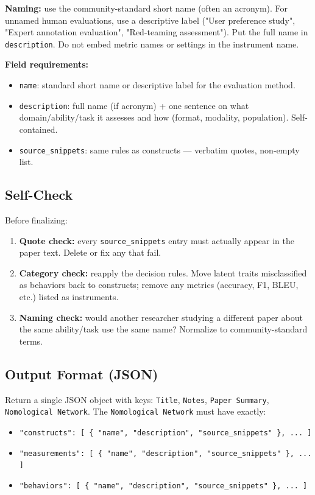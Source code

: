 \begin{tcolorbox}[breakable,enhanced,colback=blue!3,colframe=blue!40!black,title={Prompt},fonttitle=\bfseries,left=8pt,right=8pt,top=6pt,bottom=6pt]
\textbf{Naming:} use the community-standard short name (often an acronym). For unnamed human evaluations, use a descriptive label ("User preference study", "Expert annotation evaluation", "Red-teaming assessment"). Put the full name in \texttt{description}. Do not embed metric names or settings in the instrument name.

\textbf{Field requirements:}
\begin{itemize}
\item \texttt{name}: standard short name or descriptive label for the evaluation method.
\item \texttt{description}: full name (if acronym) + one sentence on what domain/ability/task it assesses and how (format, modality, population). Self-contained.
\item \texttt{source\_snippets}: same rules as constructs --- verbatim quotes, non-empty list.
\end{itemize}

\subsection*{Self-Check}

Before finalizing:
\begin{enumerate}
\item \textbf{Quote check:} every \texttt{source\_snippets} entry must actually appear in the paper text. Delete or fix any that fail.
\item \textbf{Category check:} reapply the decision rules. Move latent traits misclassified as behaviors back to constructs; remove any metrics (accuracy, F1, BLEU, etc.) listed as instruments.
\item \textbf{Naming check:} would another researcher studying a different paper about the same ability/task use the same name? Normalize to community-standard terms.
\end{enumerate}

\subsection*{Output Format (JSON)}

Return a single JSON object with keys: \texttt{Title}, \texttt{Notes}, \texttt{Paper Summary}, \texttt{Nomological Network}.
The \texttt{Nomological Network} must have exactly:
\begin{itemize}
\item \texttt{"constructs": [ \{ "name", "description", "source\_snippets" \}, ... ]}
\item \texttt{"measurements": [ \{ "name", "description", "source\_snippets" \}, ... ]}
\item \texttt{"behaviors": [ \{ "name", "description", "source\_snippets" \}, ... ]}
\end{itemize}


\end{tcolorbox}
